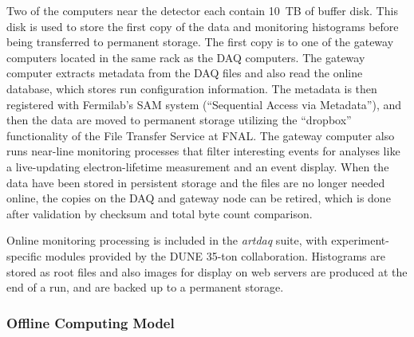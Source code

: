 
Two of the computers near the detector each contain 10~TB of buffer disk.  This disk is used to store the first copy of
the data and monitoring histograms before being transferred to permanent storage.
The first copy is to one of the gateway computers located in the same rack as the DAQ computers.  The gateway computer
extracts metadata from the DAQ files and also read the online database, which stores run configuration information.
The metadata is then registered with Fermilab's  SAM system
(``Sequential Access via Metadata''), and then the data are
moved to permanent storage utilizing the ``dropbox'' functionality of the File Transfer Service at FNAL.
The gateway computer also runs near-line monitoring processes that filter interesting events for analyses like
a live-updating electron-lifetime measurement and an event display.
When the data have been stored in persistent storage and the files are no longer needed online,
the copies on the DAQ and gateway node can be retired, which is done after validation by checksum and
total byte count comparison.

Online monitoring processing is included in the {\it artdaq} suite, with experiment-specific modules
provided by the DUNE 35-ton collaboration.  Histograms are stored as root files and also
images for display on web servers are produced at the end of a run, and are backed up to a permanent storage.


\subsubsection{Offline Computing Model}

